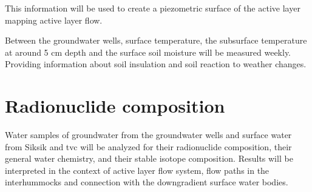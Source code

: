 This information will be used to create a piezometric surface of the active layer mapping active layer flow.

Between the groundwater wells, surface temperature, the subsurface temperature at around 5 cm depth and the surface soil moisture will be measured weekly. 
Providing information about soil insulation and soil reaction to weather changes.
\section{Radionuclide composition}
Water samples of groundwater from the groundwater wells and surface water from Siksik and \gls{tvc} will be analyzed for their radionuclide composition, their general water chemistry, and their stable isotope composition. 
Results will be interpreted in the context of active layer flow system, flow paths in the interhummocks and connection with the downgradient surface water bodies. 
